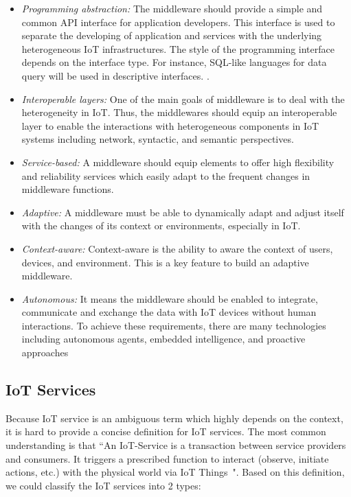 \begin{itemize}
    \item \textit{Programming abstraction: } The middleware should provide a simple and common API interface for application developers. This interface is used to separate the developing of application and services with the underlying heterogeneous IoT infrastructures. The style of the programming interface depends on the interface type. For instance, SQL-like languages for data query will be used in descriptive interfaces. \cite{TinyDBAD18:online}.
    
    \item \textit{Interoperable layers: } One of the main goals of middleware is to deal with the heterogeneity in IoT. Thus, the middlewares should equip an interoperable layer to enable the interactions with heterogeneous components in IoT systems including network, syntactic, and semantic perspectives.
    
    \item \textit{Service-based: } A middleware should equip elements to offer high flexibility and reliability services which easily adapt to the frequent changes in middleware functions. 
    
    \item \textit{Adaptive: } A middleware must be able to dynamically adapt and adjust itself with the changes of its context or environments, especially in IoT. 
    
    \item \textit{Context-aware: } Context-aware is the ability to aware the context of users, devices, and environment. This is a key feature to build an adaptive middleware. 
    
    \item \textit{Autonomous: } It means the middleware should be enabled to integrate, communicate and exchange the data with IoT devices without human interactions. To achieve these requirements, there are many technologies including autonomous agents, embedded intelligence, and proactive approaches~\cite{guo2011living}\cite{modukari2005autonomous}
    
\end{itemize}

\subsection{IoT Services }

Because IoT service is an ambiguous term which highly depends on the context, it is hard to provide a concise definition for IoT services. The most common understanding is that ``An IoT-Service is a transaction between service providers and consumers. It triggers a prescribed function to interact (observe, initiate actions, etc.) with the physical world via IoT Things~\cite{barros2012handbook}". Based on this definition, we could classify the IoT services into 2 types:

